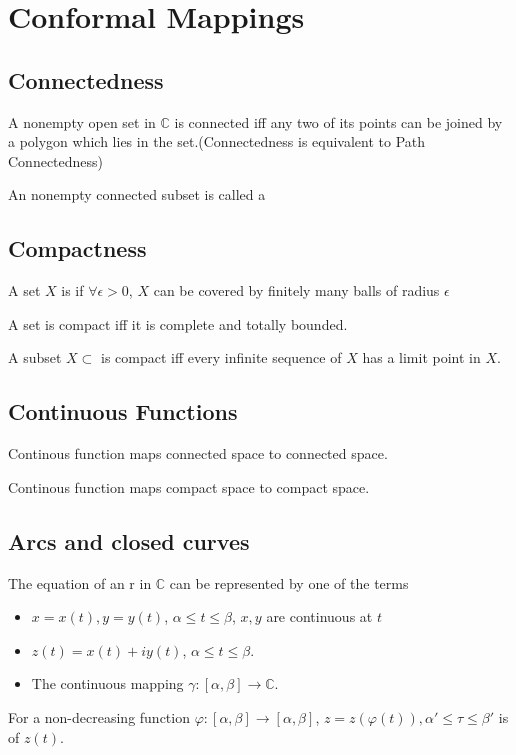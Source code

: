 \section{Conformal Mappings}

\subsection{Connectedness}
\begin{theorem}
    A nonempty open set in  $ \mathbb{C} $ is connected iff any two of its points can be joined by a polygon  which lies in the set.(\ie Connectedness is equivalent to Path Connectedness)
\end{theorem}
An nonempty connected subset is called a 
\subsection{Compactness}
\begin{definition}
     A set  $ X  $ is  if  $ \forall \epsilon>0  $,  $ X  $ can be covered by finitely many balls of radius  $ \epsilon  $ 
     
\end{definition}
\begin{theorem}
    A set is compact iff it is complete and totally bounded.
 \end{theorem}
\begin{theorem}
    A subset  $ X\subset $ is compact iff every infinite sequence of  $ X  $ has a limit point in  $ X  $.
\end{theorem}
\subsection{Continuous Functions}
\begin{theorem}
    Continous function maps connected space to connected space.
\end{theorem}
\begin{theorem}
    Continous function maps compact space to compact space.
\end{theorem}
\subsection{Arcs and closed curves}
The equation of an  r in  $ \mathbb{C} $ can  be represented by one of the terms
\begin{itemize}
    \item  $ x=x(t),y=y(t) $, $ \alpha \leq t  \leq \beta$,  $ x,y $ are continuous at  $ t $
    \item  $ z(t)=x(t)+iy(t) $, $ \alpha \leq t \leq \beta $.
    \item The  continuous mapping  $ \gamma:[\alpha,\beta]\rightarrow \mathbb{C} $. 
\end{itemize}
For a non-decreasing function  $ \varphi:[\alpha,\beta]\rightarrow[\alpha,\beta] $,  $ z=z(\varphi(t)),\alpha' \leq \tau \leq \beta' $ is   of  $ z(t) $.

